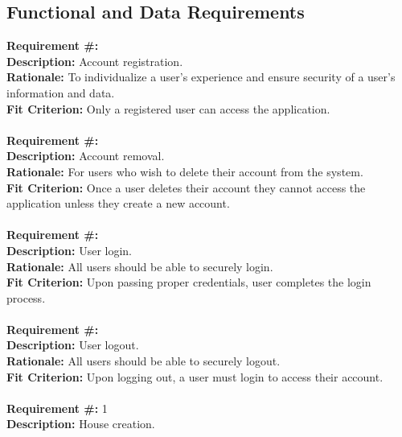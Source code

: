 \documentclass[12pt]{article}
\begin{document}
\subsection{Functional and Data Requirements}
\textbf{Requirement \#:} 
       \\
      \textbf{Description: }{Account registration.} \\
      \textbf{Rationale: }{To individualize a user's experience and ensure security of a user's information and data.} \\
      \textbf{Fit Criterion: }{Only a registered user can access the application.} \\ \\ 
\textbf{Requirement \#:} 
       \\
      \textbf{Description: }{Account removal.} \\
      \textbf{Rationale: }{For users who wish to delete their account from the system.} \\
      \textbf{Fit Criterion: }{Once a user deletes their account they cannot access the application unless they create a new account.} \\ \\ 
\textbf{Requirement \#:} 
       \\
      \textbf{Description: }{User login.} \\
      \textbf{Rationale: }{All users should be able to securely login.} \\
      \textbf{Fit Criterion: }{Upon passing proper credentials, user completes 
the login process.} \\ \\
\textbf{Requirement \#:} 
       \\
      \textbf{Description: }{User logout.} \\
      \textbf{Rationale: }{All users should be able to securely logout.} \\
      \textbf{Fit Criterion: }{Upon logging out, a user must login to access their account.} \\ \\
\textbf{Requirement \#:} 1 
       \\
      \textbf{Description:} House creation. \\
\end{document}
